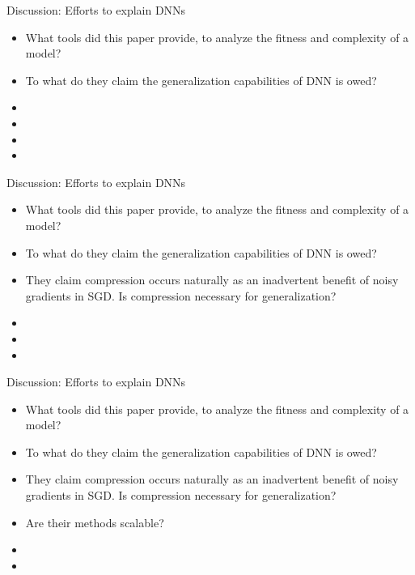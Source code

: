 \documentclass[aspectratio=169,11pt]{beamer}
\begin{document}
\begin{frame}{Discussion: Efforts to explain DNNs}

\begin{itemize}
    \item What tools did this paper provide, to analyze the fitness and complexity of a model?
    \item To what do they claim the generalization capabilities of DNN is owed?
    \item[-] 
    \item[-] 
    \item[-] 
    \item[-] 
\end{itemize}

\end{frame}

\begin{frame}{Discussion: Efforts to explain DNNs}

\begin{itemize}
    \item What tools did this paper provide, to analyze the fitness and complexity of a model?
    \item To what do they claim the generalization capabilities of DNN is owed?
    \item They claim compression occurs naturally as an inadvertent benefit of noisy gradients in SGD. Is compression necessary for generalization?
    \item[-] 
    \item[-] 
    \item[-] 
\end{itemize}

\end{frame}

\begin{frame}{Discussion: Efforts to explain DNNs}

\begin{itemize}
    \item What tools did this paper provide, to analyze the fitness and complexity of a model?
    \item To what do they claim the generalization capabilities of DNN is owed?
    \item They claim compression occurs naturally as an inadvertent benefit of noisy gradients in SGD. Is compression necessary for generalization?
    \item Are their methods scalable?
    \item[-] 
    \item[-] 
\end{itemize}

\end{frame}
\end{document}
